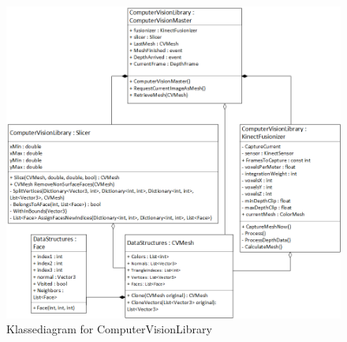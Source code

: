 \begin{figure}[H]
    \centering
    \includegraphics[width=1\textwidth]{figurer/d/Design/Class/uml_class_computervisionlibrary}
    \caption{Klassediagram for ComputerVisionLibrary}
    \label{class_ComputerVisionLib}
\end{figure}
\newpage

